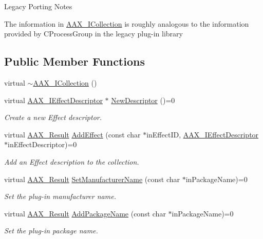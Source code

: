\begin{DoxyRefDesc}{Legacy Porting Notes}
\item[\mbox{\hyperlink{a00787__porting_notes000037}{Legacy Porting Notes}}]The information in \mbox{\hyperlink{a01777}{A\+A\+X\+\_\+\+I\+Collection}} is roughly analogous to the information provided by C\+Process\+Group in the legacy plug-\/in library\end{DoxyRefDesc}
\subsection*{Public Member Functions}
\begin{DoxyCompactItemize}
\item 
virtual \mbox{\hyperlink{a01777_a830a9afde909fafd772f2d935a78e337}{$\sim$\+A\+A\+X\+\_\+\+I\+Collection}} ()
\item 
virtual \mbox{\hyperlink{a01813}{A\+A\+X\+\_\+\+I\+Effect\+Descriptor}} $\ast$ \mbox{\hyperlink{a01777_afab70588134a065a5b4d6ea6ddd5ddff}{New\+Descriptor}} ()=0
\begin{DoxyCompactList}\small\item\em Create a new Effect descriptor. \end{DoxyCompactList}\item 
virtual \mbox{\hyperlink{a00392_a4d8f69a697df7f70c3a8e9b8ee130d2f}{A\+A\+X\+\_\+\+Result}} \mbox{\hyperlink{a01777_a5ff114b8c4da2081515186f2faf65c8c}{Add\+Effect}} (const char $\ast$in\+Effect\+ID, \mbox{\hyperlink{a01813}{A\+A\+X\+\_\+\+I\+Effect\+Descriptor}} $\ast$in\+Effect\+Descriptor)=0
\begin{DoxyCompactList}\small\item\em Add an Effect description to the collection. \end{DoxyCompactList}\item 
virtual \mbox{\hyperlink{a00392_a4d8f69a697df7f70c3a8e9b8ee130d2f}{A\+A\+X\+\_\+\+Result}} \mbox{\hyperlink{a01777_a7fbeab9630460b9bf4525512609855f0}{Set\+Manufacturer\+Name}} (const char $\ast$in\+Package\+Name)=0
\begin{DoxyCompactList}\small\item\em Set the plug-\/in manufacturer name. \end{DoxyCompactList}\item 
virtual \mbox{\hyperlink{a00392_a4d8f69a697df7f70c3a8e9b8ee130d2f}{A\+A\+X\+\_\+\+Result}} \mbox{\hyperlink{a01777_acf7410e0d06cf64bea36bf7d18b3456c}{Add\+Package\+Name}} (const char $\ast$in\+Package\+Name)=0
\begin{DoxyCompactList}\small\item\em Set the plug-\/in package name. \end{DoxyCompactList}\item 

\end{DoxyCompactItemize}

